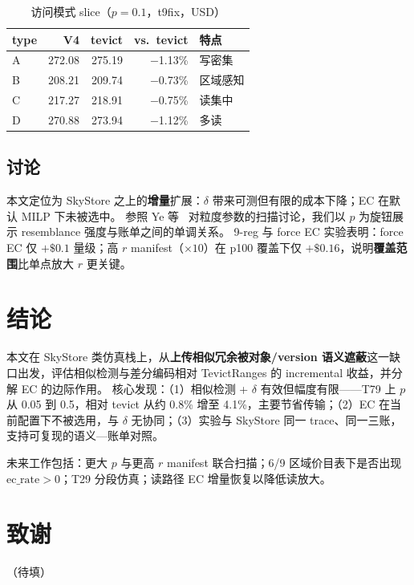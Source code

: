 \documentclass[conference]{IEEEtran}
\begin{document}
\begin{table}[t]
\centering
\caption{访问模式 slice（$p{=}0.1$，t9fix，USD）}
\label{tab:types}
\begin{tabular}{lrrrl}
\toprule
type & V4 & tevict & vs.\ tevict & 特点 \\
\midrule
A & 272.08 & 275.19 & $-$1.13\% & 写密集 \\
B & 208.21 & 209.74 & $-$0.73\% & 区域感知 \\
C & 217.27 & 218.91 & $-$0.75\% & 读集中 \\
D & 270.88 & 273.94 & $-$1.12\% & 多读 \\
\bottomrule
\end{tabular}
\end{table}

\subsection{讨论}

本文定位为 SkyStore 之上的\textbf{增量}扩展：$\delta$ 带来可测但有限的成本下降；EC 在默认 MILP 下未被选中。
参照 Ye 等~\cite{ye2021fast} 对粒度参数的扫描讨论，我们以 $p$ 为旋钮展示 resemblance 强度与账单之间的单调关系。
9-reg 与 force EC 实验表明：force EC 仅 $+\$0.1$ 量级；高 $r$ manifest（$\times 10$）在 p100 覆盖下仅 $+\$0.16$，说明\textbf{覆盖范围}比单点放大 $r$ 更关键。

\section{结论}
\label{sec:conclusion}

本文在 SkyStore 类仿真栈上，从\textbf{上传相似冗余被对象/version 语义遮蔽}这一缺口出发，评估相似检测与差分编码相对 TevictRanges 的 incremental 收益，并分解 EC 的边际作用。
核心发现：（1）相似检测 + $\delta$ 有效但幅度有限——T79 上 $p$ 从 0.05 到 0.5，相对 tevict 从约 0.8\% 增至 4.1\%，主要节省传输；（2）EC 在当前配置下不被选用，与 $\delta$ 无协同；（3）实验与 SkyStore 同一 trace、同一三账，支持可复现的语义—账单对照。

未来工作包括：更大 $p$ 与更高 $r$ manifest 联合扫描；6/9 区域价目表下是否出现 $\mathrm{ec\_rate}{>}0$；T29 分段仿真；读路径 EC 增量恢复以降低读放大。

\section*{致谢}
（待填）



\end{document}
